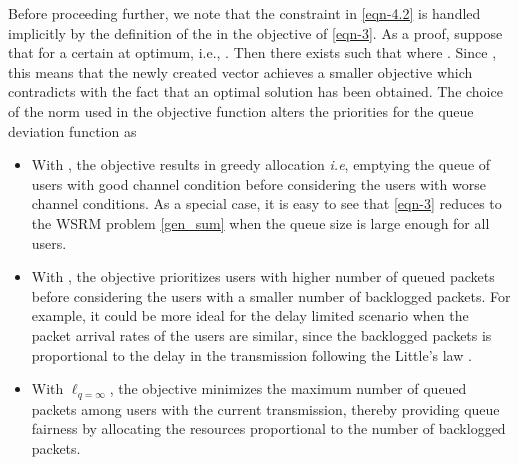 Before proceeding further, we note that the constraint in \eqref{eqn-4.2} is handled implicitly by the definition of the  in the objective of \eqref{eqn-3}. As a proof, suppose that  for a certain  at optimum, i.e., . Then there exists  such that  where . Since , this means that the newly created vector  achieves a smaller objective which contradicts with the fact that an optimal solution has been obtained. The choice of the norm  used in the objective function \cite{berry2004cross,qps_cioffi} alters the priorities for the queue deviation function as
\begin{itemize}
\item With , the objective results in greedy allocation \textit{i.e}, emptying the queue of users with good channel condition before considering the users with worse channel conditions. As a special case, it is easy to see that \eqref{eqn-3} reduces to the \ac{WSRM} problem \eqref{gen_sum} when the queue size is large enough for all users.
\item With , the objective prioritizes users with higher number of queued packets before considering the users with a smaller number of backlogged packets. For example, it could be more ideal for the delay limited scenario when the packet arrival rates of the users are similar, since the backlogged packets is proportional to the delay in the transmission following the Little's law \cite{neely2010stochastic}.
\item With \(\ell_{q = \infty} \), the objective minimizes the maximum number of queued packets among users with the current transmission, thereby providing queue fairness by allocating the resources proportional to the number of backlogged packets.
\end{itemize}